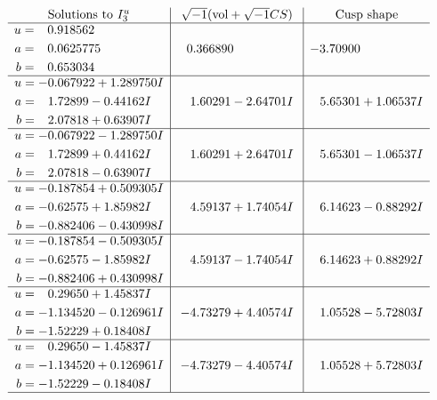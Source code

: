 \documentclass[1p]{elsarticle_modified}
\theoremstyle{definition}
\newcommand{\I}{\sqrt{-1}}
\begin{document}
$$\begin{array}{c|c|c}  
\text{Solutions to }I^u_{3}& \I (\text{vol} + \sqrt{-1}CS) & \text{Cusp shape}\\
 \hline 
\begin{aligned}
u &= \phantom{-}0.918562\phantom{ +0.000000I} \\
a &= \phantom{-}0.0625775\phantom{ +0.000000I} \\
b &= \phantom{-}0.653034\phantom{ +0.000000I}\end{aligned}
 & \phantom{-}0.366890\phantom{ +0.000000I} & -3.70900\phantom{ +0.000000I} \\ \hline\begin{aligned}
u &= -0.067922 + 1.289750 I \\
a &= \phantom{-}1.72899 - 0.44162 I \\
b &= \phantom{-}2.07818 + 0.63907 I\end{aligned}
 & \phantom{-}1.60291 - 2.64701 I & \phantom{-}5.65301 + 1.06537 I \\ \hline\begin{aligned}
u &= -0.067922 - 1.289750 I \\
a &= \phantom{-}1.72899 + 0.44162 I \\
b &= \phantom{-}2.07818 - 0.63907 I\end{aligned}
 & \phantom{-}1.60291 + 2.64701 I & \phantom{-}5.65301 - 1.06537 I \\ \hline\begin{aligned}
u &= -0.187854 + 0.509305 I \\
a &= -0.62575 + 1.85982 I \\
b &= -0.882406 - 0.430998 I\end{aligned}
 & \phantom{-}4.59137 + 1.74054 I & \phantom{-}6.14623 - 0.88292 I \\ \hline\begin{aligned}
u &= -0.187854 - 0.509305 I \\
a &= -0.62575 - 1.85982 I \\
b &= -0.882406 + 0.430998 I\end{aligned}
 & \phantom{-}4.59137 - 1.74054 I & \phantom{-}6.14623 + 0.88292 I \\ \hline\begin{aligned}
u &= \phantom{-}0.29650 + 1.45837 I \\
a &= -1.134520 - 0.126961 I \\
b &= -1.52229 + 0.18408 I\end{aligned}
 & -4.73279 + 4.40574 I & \phantom{-}1.05528 - 5.72803 I \\ \hline\begin{aligned}
u &= \phantom{-}0.29650 - 1.45837 I \\
a &= -1.134520 + 0.126961 I \\
b &= -1.52229 - 0.18408 I\end{aligned}
 & -4.73279 - 4.40574 I & \phantom{-}1.05528 + 5.72803 I\\
 \hline 
 \end{array}$$\newpage\newpage\renewcommand{\arraystretch}{1}
\end{document}
